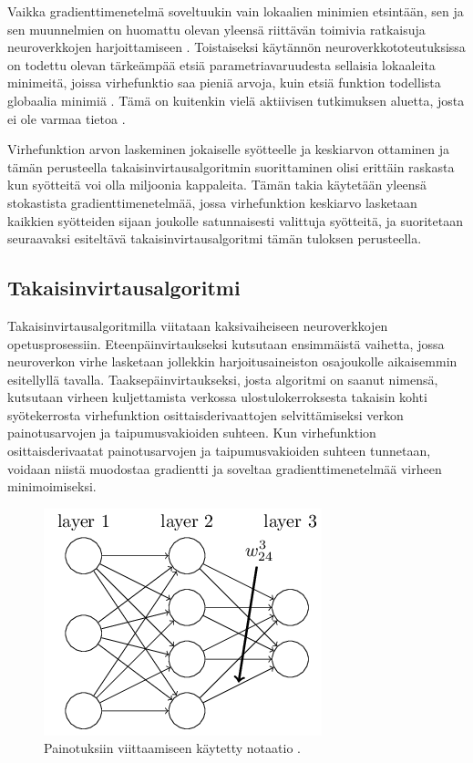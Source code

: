 \documentclass[finnish]{tktltiki2}
\theoremstyle{definition}
\theoremstyle{remark}
\begin{document}
    Vaikka gradienttimenetelmä soveltuukin vain lokaalien minimien etsintään, sen ja sen muunnelmien on huomattu olevan yleensä riittävän toimivia ratkaisuja neuroverkkojen harjoittamiseen \cite{Rumelhart-1986-back-prop}\cite{Goodfellow-et-al-2016}. Toistaiseksi käytännön neuroverkkototeutuksissa on todettu olevan tärkeämpää etsiä parametriavaruudesta sellaisia lokaaleita minimeitä, joissa virhefunktio saa pieniä arvoja, kuin etsiä funktion todellista globaalia minimiä \cite{neural-optimization-goodfellow-2015}. Tämä on kuitenkin vielä aktiivisen tutkimuksen aluetta, josta ei ole varmaa tietoa \cite{Goodfellow-et-al-2016}.

    Virhefunktion arvon laskeminen jokaiselle syötteelle ja keskiarvon ottaminen ja tämän perusteella takaisinvirtausalgoritmin suorittaminen olisi erittäin raskasta kun syötteitä voi olla miljoonia kappaleita. Tämän takia käytetään yleensä stokastista gradienttimenetelmää, jossa virhefunktion keskiarvo lasketaan kaikkien syötteiden sijaan joukolle satunnaisesti valittuja syötteitä, ja suoritetaan seuraavaksi esiteltävä takaisinvirtausalgoritmi tämän tuloksen perusteella.


  \subsection{Takaisinvirtausalgoritmi}
    Takaisinvirtausalgoritmilla viitataan kaksivaiheiseen neuroverkkojen opetusprosessiin. Eteenpäinvirtaukseksi kutsutaan ensimmäistä vaihetta, jossa neuroverkon virhe lasketaan jollekkin harjoitusaineiston osajoukolle aikaisemmin esitellyllä tavalla. Taaksepäinvirtaukseksi, josta algoritmi on saanut nimensä, kutsutaan virheen kuljettamista verkossa ulostulokerroksesta takaisin kohti syötekerrosta virhefunktion osittaisderivaattojen selvittämiseksi verkon painotusarvojen ja taipumusvakioiden suhteen. Kun virhefunktion osittaisderivaatat painotusarvojen ja taipumusvakioiden suhteen tunnetaan, voidaan niistä muodostaa gradientti ja soveltaa gradienttimenetelmää virheen minimoimiseksi.

    \begin{figure}[h]
      \centering
      \includegraphics[scale=0.4]{neuron-notation}
      \caption{Painotuksiin viittaamiseen käytetty notaatio \cite{Nielsen-neural}.}
      \label{pic:chain-rule}
    \end{figure}
\end{document}
